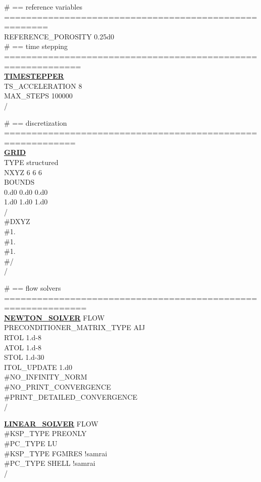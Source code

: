 \noindent
\# == reference variables ======================================================\\
REFERENCE\_POROSITY 0.25d0\\

\noindent
\# == time stepping ============================================================\\
\hyperlink{target_timestep}{\bf TIMESTEPPER}\\
TS\_ACCELERATION 8\\
MAX\_STEPS 100000\\
/

\noindent
\# == discretization ===========================================================\\
\hyperlink{target_grid}{\bf GRID}\\
TYPE structured\\
NXYZ 6 6 6\\
BOUNDS\\
0.d0 0.d0 0.d0\\
1.d0 1.d0 1.d0\\
/\\
\#DXYZ\\
\#1.\\
\#1.\\
\#1.\\
\#/\\
/

\noindent
\# == flow solvers =============================================================\\
\hyperlink{target_newt}{\bf NEWTON\_SOLVER} FLOW\\
PRECONDITIONER\_MATRIX\_TYPE AIJ\\
RTOL 1.d-8\\
ATOL 1.d-8\\
STOL 1.d-30\\
ITOL\_UPDATE 1.d0\\
\#NO\_INFINITY\_NORM\\
\#NO\_PRINT\_CONVERGENCE\\
\#PRINT\_DETAILED\_CONVERGENCE\\
/

\noindent
\hyperlink{target_linsolv}{\bf LINEAR\_SOLVER} FLOW\\
\#KSP\_TYPE PREONLY\\
\#PC\_TYPE LU\\
\#KSP\_TYPE FGMRES !samrai\\
\#PC\_TYPE SHELL !samrai\\
/

